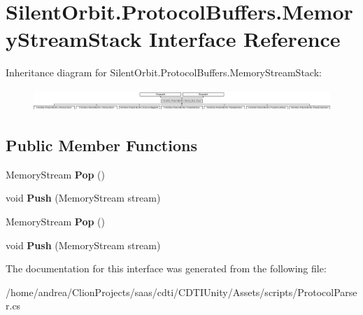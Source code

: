 \hypertarget{interface_silent_orbit_1_1_protocol_buffers_1_1_memory_stream_stack}{}\section{Silent\+Orbit.\+Protocol\+Buffers.\+Memory\+Stream\+Stack Interface Reference}
\label{interface_silent_orbit_1_1_protocol_buffers_1_1_memory_stream_stack}
Inheritance diagram for Silent\+Orbit.\+Protocol\+Buffers.\+Memory\+Stream\+Stack\+:\begin{figure}[H]
\begin{center}
\leavevmode
\includegraphics[height=0.821918cm]{interface_silent_orbit_1_1_protocol_buffers_1_1_memory_stream_stack}
\end{center}
\end{figure}
\subsection*{Public Member Functions}
\begin{DoxyCompactItemize}
\item 
Memory\+Stream {\bfseries Pop} ()\hypertarget{interface_silent_orbit_1_1_protocol_buffers_1_1_memory_stream_stack_a7408e30789e2d7ee77cd166e69b98a48}{}\label{interface_silent_orbit_1_1_protocol_buffers_1_1_memory_stream_stack_a7408e30789e2d7ee77cd166e69b98a48}

\item 
void {\bfseries Push} (Memory\+Stream stream)\hypertarget{interface_silent_orbit_1_1_protocol_buffers_1_1_memory_stream_stack_a1ae64da82a0acdfaaec81a0697d3c070}{}\label{interface_silent_orbit_1_1_protocol_buffers_1_1_memory_stream_stack_a1ae64da82a0acdfaaec81a0697d3c070}

\item 
Memory\+Stream {\bfseries Pop} ()\hypertarget{interface_silent_orbit_1_1_protocol_buffers_1_1_memory_stream_stack_a7408e30789e2d7ee77cd166e69b98a48}{}\label{interface_silent_orbit_1_1_protocol_buffers_1_1_memory_stream_stack_a7408e30789e2d7ee77cd166e69b98a48}

\item 
void {\bfseries Push} (Memory\+Stream stream)\hypertarget{interface_silent_orbit_1_1_protocol_buffers_1_1_memory_stream_stack_a1ae64da82a0acdfaaec81a0697d3c070}{}\label{interface_silent_orbit_1_1_protocol_buffers_1_1_memory_stream_stack_a1ae64da82a0acdfaaec81a0697d3c070}

\end{DoxyCompactItemize}


The documentation for this interface was generated from the following file\+:\begin{DoxyCompactItemize}
\item 
/home/andrea/\+Clion\+Projects/saas/cdti/\+C\+D\+T\+I\+Unity/\+Assets/scripts/Protocol\+Parser.\+cs\end{DoxyCompactItemize}
